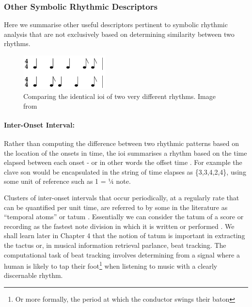 \subsubsection{Other Symbolic Rhythmic Descriptors}

Here we summarise other useful descriptors pertinent to symbolic rhythmic analysis that are not exclusively based on determining similarity between two rhythms.

\begin{figure}
	\begin{center}
		\includegraphics[width=0.4\textwidth]{ch03_symbolic/figures/ioi_comparison.png}
	\end{center}
	\caption[Comparing the identical IOI of two very different rhythms.]{Comparing the identical \acrshort{ioi} of two very different rhythms. Image from \cite{Dixon2004} }
	\label{fig:ioi_comparison}
\end{figure}


\paragraph{Inter-Onset Interval:} 
Rather than computing the difference between two rhythmic patterns based on the location of the onsets in time, the \acrfull{ioi} summarises a rhythm based on the time elapsed between each onset - or in other words the offset time \citep{Toussaint2013}. For example the clave son would be encapsulated in the string of time elapses as \{3,3,4,2,4\}, using some unit of reference such as 1 = ¼ note. 

Clusters of inter-onset intervals that occur periodically, at a regularly rate that can be quantified per unit time, are referred to by some in the literature as “temporal atoms” or tatum \citep{Bilmes1993, Sethares2007, Jehan2005}. Essentially we can consider the tatum of a score or recording as the fastest note division in which it is written or performed \citep{Sethares2007}. We shall learn later in Chapter 4 that the notion of tatum is important in extracting the tactus or, in musical information retrieval parlance, beat tracking. The computational task of beat tracking involves determining from a signal where a human is likely to tap their foot\footnote{Or more formally, the period at which the conductor swings their baton} when listening to music with a clearly discernable rhythm. 

